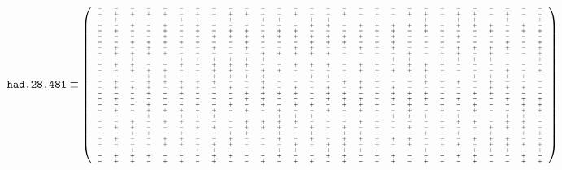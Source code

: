 \documentclass[11pt,a4paper]{article}
\begin{document}
  \[\texttt{had.28.481}\equiv {\fontsize{4}{5}\selectfont \left( \begin{array}{cccccccccccccccccccccccccccc}
-&-&-&-&-&-&-&-&-&-&-&-&-&-&-&-&-&-&-&-&-&-&-&-&-&-&-&-\\
-&+&+&+&+&-&+&-&+&+&-&-&+&-&-&+&-&-&-&+&+&-&+&+&-&+&-&-\\
-&+&-&-&-&+&+&-&+&-&+&+&-&+&+&-&-&+&-&-&+&-&+&+&-&+&-&+\\
-&-&+&-&+&-&+&-&-&-&-&-&-&+&+&-&+&+&+&+&+&-&+&+&+&-&+&-\\
-&+&-&-&+&-&+&-&+&+&-&+&+&-&-&-&-&+&+&-&+&+&-&-&+&-&+&+\\
-&-&-&-&+&-&+&+&+&+&+&+&+&+&+&+&+&-&+&-&-&-&+&-&-&-&-&-\\
-&-&+&+&+&+&+&-&-&+&-&-&-&+&+&+&-&+&+&-&-&+&-&-&-&+&-&+\\
-&+&-&+&-&-&-&+&-&+&-&-&+&+&-&-&+&+&+&-&-&-&+&+&+&+&-&+\\
-&+&+&+&+&-&-&-&-&-&+&+&+&+&+&-&-&-&-&+&-&+&+&-&+&-&-&+\\
-&-&+&-&-&+&+&+&+&+&+&-&-&-&-&-&-&-&+&+&-&+&+&+&+&-&-&+\\
-&+&+&-&-&+&-&+&+&+&-&-&+&+&+&-&+&+&-&+&+&+&-&-&-&-&-&-\\
-&-&+&+&+&-&-&+&+&-&+&+&-&-&-&-&+&+&+&+&+&-&-&-&-&+&-&+\\
-&-&-&+&+&-&-&+&+&+&+&-&-&+&+&-&-&-&-&-&+&+&-&+&+&+&+&-\\
-&+&-&+&+&+&+&+&-&-&+&-&-&-&-&+&+&+&-&-&+&+&+&-&+&-&-&-\\
-&+&+&+&-&+&+&-&+&-&+&-&+&-&+&-&+&-&+&-&-&-&-&-&+&+&+&-\\
-&-&-&+&-&+&-&-&-&+&+&+&+&-&+&+&-&+&+&+&+&-&-&+&+&-&-&-\\
-&+&-&-&-&-&-&-&-&+&+&-&-&-&+&+&+&-&+&+&+&+&+&-&-&+&+&+\\
-&-&-&+&-&-&+&-&+&-&+&-&+&+&-&+&+&+&-&+&-&+&-&+&-&-&+&+\\
-&+&-&+&+&+&+&+&-&+&-&+&-&-&+&-&+&-&-&+&-&-&-&+&-&-&+&+\\
-&-&-&+&-&+&+&+&-&-&-&+&+&+&-&-&-&-&+&+&+&+&+&-&-&+&+&-\\
-&-&+&-&+&+&-&-&-&+&+&+&+&-&-&-&+&+&-&-&-&+&+&+&-&+&+&-\\
-&+&+&-&-&-&+&+&-&+&+&+&-&+&-&+&-&+&-&+&-&-&-&-&+&+&+&-\\
-&-&+&+&-&+&-&-&+&+&-&+&-&+&-&+&+&-&-&-&+&-&+&-&+&-&+&+\\
-&+&-&-&+&+&-&-&+&-&-&+&-&+&-&+&+&-&+&+&-&+&-&+&+&+&-&-\\
-&-&-&-&+&+&-&+&+&-&-&-&+&-&+&+&-&+&-&+&-&-&+&-&+&+&+&+\\
-&-&+&-&-&-&+&+&-&-&-&+&+&-&+&+&+&-&-&-&+&+&-&+&+&+&-&+\\
-&+&+&+&-&-&-&+&+&-&-&+&-&-&+&+&-&+&+&-&-&+&+&+&-&-&+&-\\
-&+&+&-&+&+&-&+&-&-&+&-&+&+&-&+&-&-&+&-&+&-&-&+&-&-&+&+
  \end{array}
  \right)}\]
\end{document}
